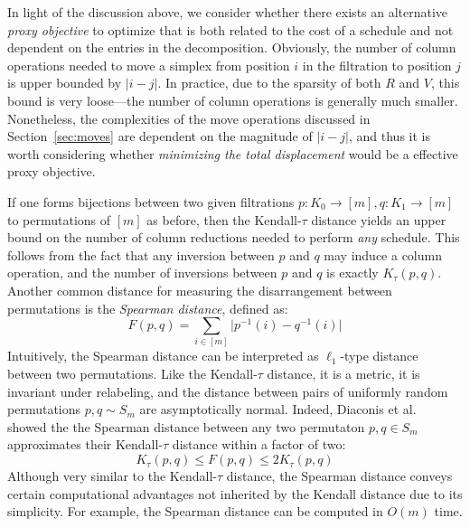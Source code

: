 \documentclass{siamart190516}
\DeclareMathOperator*{\argmin}{arg\,min}
\begin{document}
In light of the discussion above, we consider whether there exists an alternative \emph{proxy objective} to optimize that is both related to the cost of a schedule and not dependent on the entries in the decomposition. 
Obviously, the number of column operations needed to move a simplex from position $i$ in the filtration to position $j$ is upper bounded by $\lvert i - j \rvert$. In practice, due to the sparsity of both $R$ and $V$, this bound is very loose---the number of column operations is generally much smaller. Nonetheless, the complexities of the move operations discussed in Section~\ref{sec:moves} are dependent on the magnitude of $\lvert i - j \rvert$, and thus it is worth considering whether  \emph{minimizing the total displacement} would be a effective proxy objective. 

If one forms bijections between two given filtrations $p: K_0 \to [m], q: K_1 \to [m]$ to permutations of $[m]$ as before, then the Kendall-$\tau$ distance yields an upper bound on the number of column reductions needed to perform \emph{any} schedule. This follows from the fact that any inversion between $p$ and $q$ may induce a column operation, and the number of inversions between $p$ and $q$ is exactly $K_{\tau}(p, q)$. Another common distance for measuring the disarrangement between permutations is the \emph{Spearman distance}, defined as:
\begin{equation}\label{eq:spearman_dist}
F(p, q) = \sum\limits_{i \in [m]} \lvert p^{-1}(i) - q^{-1}(i) \rvert
\end{equation}
Intuitively, the Spearman distance can be interpreted as $\ell_1$-type distance between two permutations. Like the Kendall-$\tau$ distance, it is a metric, it is invariant under relabeling, and the distance between pairs of uniformly random permutations $p, q \sim S_m$ are asymptotically normal. Indeed, Diaconis et al.~\cite{diaconis1977spearman} showed the the Spearman distance between any two permutaton $p, q \in S_m$ approximates their Kendall-$\tau$ distance within a factor of two: 
\begin{equation}\label{eq:diaconis_inequality}
K_\tau(p, q) \leq F(p, q) \leq 2 K_\tau(p, q)
\end{equation}
Although very similar to the Kendall-$\tau$ distance, the Spearman distance conveys certain computational advantages not inherited by the Kendall distance due to its simplicity. 
For example, the Spearman distance can be computed in $O(m)$ time.

\end{document}
